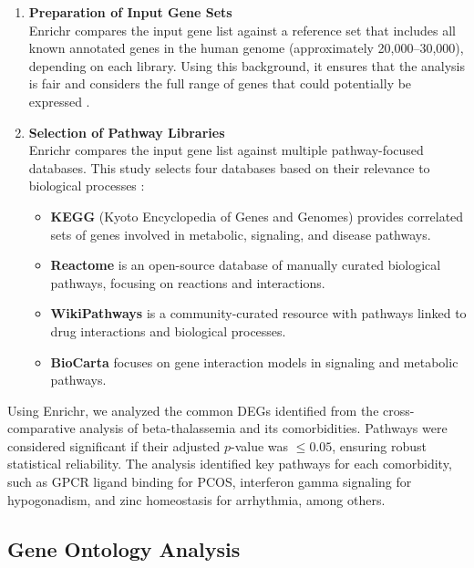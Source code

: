 \begin{enumerate}
    \item \textbf{Preparation of Input Gene Sets} \\
          Enrichr compares the input gene list against a reference set that includes all known annotated genes in the human genome (approximately 20,000--30,000), depending on each library. Using this background, it ensures that the analysis is fair and considers the full range of genes that could potentially be expressed \cite{b17}.
    \item \textbf{Selection of Pathway Libraries} \\
          Enrichr compares the input gene list against multiple pathway-focused databases. This study selects four databases based on their relevance to biological processes \cite{b19}:
          \begin{itemize}
              \item \textbf{KEGG} (Kyoto Encyclopedia of Genes and Genomes) provides correlated sets of genes involved in metabolic, signaling, and disease pathways.
              \item \textbf{Reactome} is an open-source database of manually curated biological pathways, focusing on reactions and interactions.
              \item \textbf{WikiPathways} is a community-curated resource with pathways linked to drug interactions and biological processes.
              \item \textbf{BioCarta} focuses on gene interaction models in signaling and metabolic pathways.
          \end{itemize}
\end{enumerate}

Using Enrichr, we analyzed the common DEGs identified from the cross-comparative analysis of beta-thalassemia and its comorbidities. Pathways were considered significant if their adjusted $p$-value was $\leq 0.05$, ensuring robust statistical reliability. The analysis identified key pathways for each comorbidity, such as GPCR ligand binding for PCOS, interferon gamma signaling for hypogonadism, and zinc homeostasis for arrhythmia, among others.

\vspace*{-\parskip} %
\subsection{Gene Ontology Analysis}
\label{sec:sec3_4_5}

